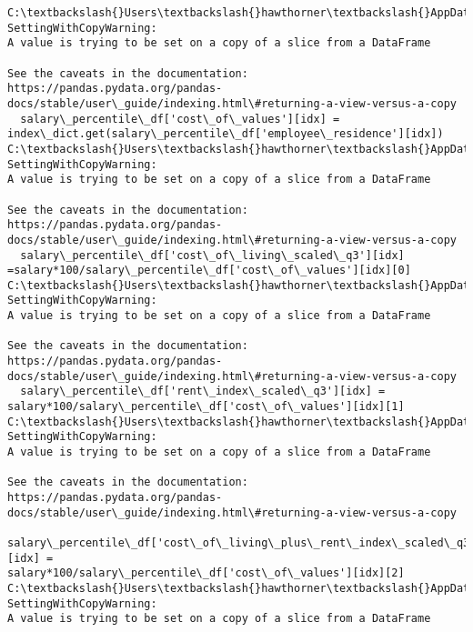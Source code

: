 \documentclass[11pt]{article}
\begin{document}
    \begin{Verbatim}[commandchars=\\\{\}]
C:\textbackslash{}Users\textbackslash{}hawthorner\textbackslash{}AppData\textbackslash{}Local\textbackslash{}Temp\textbackslash{}ipykernel\_22188\textbackslash{}773068333.py:8:
SettingWithCopyWarning:
A value is trying to be set on a copy of a slice from a DataFrame

See the caveats in the documentation: https://pandas.pydata.org/pandas-
docs/stable/user\_guide/indexing.html\#returning-a-view-versus-a-copy
  salary\_percentile\_df['cost\_of\_values'][idx] =
index\_dict.get(salary\_percentile\_df['employee\_residence'][idx])
C:\textbackslash{}Users\textbackslash{}hawthorner\textbackslash{}AppData\textbackslash{}Local\textbackslash{}Temp\textbackslash{}ipykernel\_22188\textbackslash{}773068333.py:29:
SettingWithCopyWarning:
A value is trying to be set on a copy of a slice from a DataFrame

See the caveats in the documentation: https://pandas.pydata.org/pandas-
docs/stable/user\_guide/indexing.html\#returning-a-view-versus-a-copy
  salary\_percentile\_df['cost\_of\_living\_scaled\_q3'][idx]
=salary*100/salary\_percentile\_df['cost\_of\_values'][idx][0]
C:\textbackslash{}Users\textbackslash{}hawthorner\textbackslash{}AppData\textbackslash{}Local\textbackslash{}Temp\textbackslash{}ipykernel\_22188\textbackslash{}773068333.py:30:
SettingWithCopyWarning:
A value is trying to be set on a copy of a slice from a DataFrame

See the caveats in the documentation: https://pandas.pydata.org/pandas-
docs/stable/user\_guide/indexing.html\#returning-a-view-versus-a-copy
  salary\_percentile\_df['rent\_index\_scaled\_q3'][idx] =
salary*100/salary\_percentile\_df['cost\_of\_values'][idx][1]
C:\textbackslash{}Users\textbackslash{}hawthorner\textbackslash{}AppData\textbackslash{}Local\textbackslash{}Temp\textbackslash{}ipykernel\_22188\textbackslash{}773068333.py:31:
SettingWithCopyWarning:
A value is trying to be set on a copy of a slice from a DataFrame

See the caveats in the documentation: https://pandas.pydata.org/pandas-
docs/stable/user\_guide/indexing.html\#returning-a-view-versus-a-copy
  salary\_percentile\_df['cost\_of\_living\_plus\_rent\_index\_scaled\_q3'][idx] =
salary*100/salary\_percentile\_df['cost\_of\_values'][idx][2]
C:\textbackslash{}Users\textbackslash{}hawthorner\textbackslash{}AppData\textbackslash{}Local\textbackslash{}Temp\textbackslash{}ipykernel\_22188\textbackslash{}773068333.py:32:
SettingWithCopyWarning:
A value is trying to be set on a copy of a slice from a DataFrame


\end{Verbatim}
\end{document}
